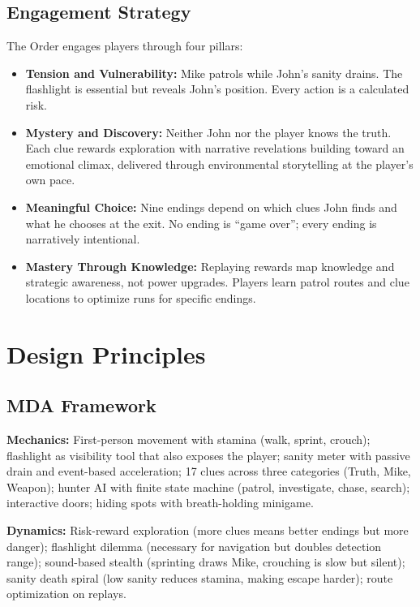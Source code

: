 \documentclass[12pt, letterpaper]{article}
\begin{document}
\subsection{Engagement Strategy}

The Order engages players through four pillars:
\begin{itemize}[leftmargin=2em, topsep=0pt, itemsep=2pt]
    \item \textbf{Tension and Vulnerability:} Mike patrols while John's sanity drains. The flashlight is essential but reveals John's position. Every action is a calculated risk.
    \item \textbf{Mystery and Discovery:} Neither John nor the player knows the truth. Each clue rewards exploration with narrative revelations building toward an emotional climax, delivered through environmental storytelling at the player's own pace.
    \item \textbf{Meaningful Choice:} Nine endings depend on which clues John finds and what he chooses at the exit. No ending is ``game over''; every ending is narratively intentional.
    \item \textbf{Mastery Through Knowledge:} Replaying rewards map knowledge and strategic awareness, not power upgrades. Players learn patrol routes and clue locations to optimize runs for specific endings.
\end{itemize}

\section{Design Principles}

\subsection{MDA Framework}

\textbf{Mechanics:} First-person movement with stamina (walk, sprint, crouch); flashlight as visibility tool that also exposes the player; sanity meter with passive drain and event-based acceleration; 17 clues across three categories (Truth, Mike, Weapon); hunter AI with finite state machine (patrol, investigate, chase, search); interactive doors; hiding spots with breath-holding minigame.

\textbf{Dynamics:} Risk-reward exploration (more clues means better endings but more danger); flashlight dilemma (necessary for navigation but doubles detection range); sound-based stealth (sprinting draws Mike, crouching is slow but silent); sanity death spiral (low sanity reduces stamina, making escape harder); route optimization on replays.
\end{document}
